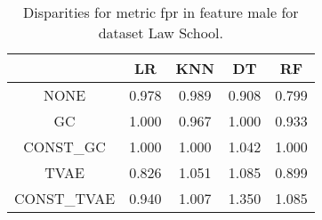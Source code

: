 \begin{table}
\caption{Disparities for metric fpr in feature male for dataset Law School.}
\label{tab:disp-LAW SCHOOL-male-fpr}
\begin{tabular}{ccccc}
\toprule
 & LR & KNN & DT & RF \\
\midrule
NONE & 0.978 & 0.989 & 0.908 & 0.799 \\
GC & 1.000 & 0.967 & 1.000 & 0.933 \\
CONST\_GC & 1.000 & 1.000 & 1.042 & 1.000 \\
TVAE & 0.826 & 1.051 & 1.085 & 0.899 \\
CONST\_TVAE & 0.940 & 1.007 & 1.350 & 1.085 \\
\bottomrule
\end{tabular}
\end{table}
